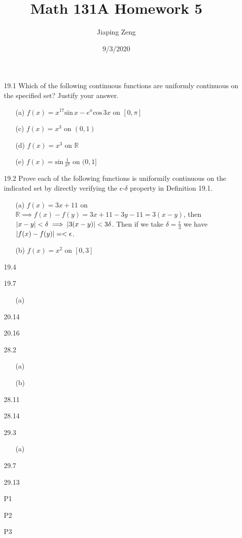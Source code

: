 \documentclass{article}
\title{Math 131A Homework 5}
\date{9/3/2020}
\author{Jiaping Zeng}
\begin{document}
\maketitle

\begin{itemize}
    \item [19.1] Which of the following continuous functions are uniformly continuous on the specified set? Justify your answer.
          \begin{itemize}
              \item [(a)] $f(x)=x^{17}\text{sin}\,x-e^x\text{cos}\,3x$ on $[0,\pi]$
              \item [(c)] $f(x)=x^3$ on $(0,1)$
              \item [(d)] $f(x)=x^3$ on $\mathbb{R}$
              \item [(e)] $f(x)=\text{sin}\,\frac{1}{x^2}$ on $(0,1]$
          \end{itemize}
    \item [19.2] Prove each of the following functions is uniformily continuous on the indicated set by directly verifying the $\epsilon$-$\delta$ property in Definition 19.1.
          \begin{itemize}
              \item [(a)] $f(x)=3x+11$ on $\mathbb{R}\implies f(x)-f(y)=3x+11-3y-11=3(x-y)$, then $\abs{x-y}<\delta\implies\abs{3(x-y)}<3\delta$. Then if we take $\delta=\frac{\epsilon}{3}$ we have $\abs{f(x)-f(y)}=<\epsilon$.
              \item [(b)] $f(x)=x^2$ on $[0,3]$
          \end{itemize}
    \item [19.4]
    \item [19.7]
          \begin{itemize}
              \item [(a)]
          \end{itemize}
    \item [20.14]
    \item [20.16]
    \item [28.2]
          \begin{itemize}
              \item [(a)]
              \item [(b)]
          \end{itemize}
    \item [28.11]
    \item [28.14]
    \item [29.3]
          \begin{itemize}
              \item [(a)]
          \end{itemize}
    \item [29.7]
    \item [29.13]
    \item [P1]
    \item [P2]
    \item [P3]
\end{itemize}
\end{document}
